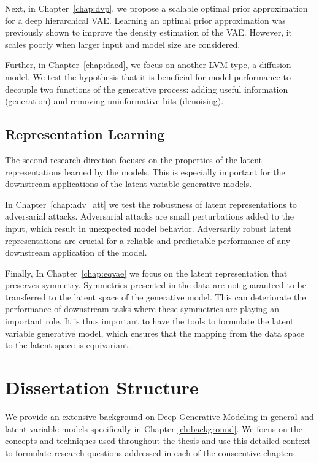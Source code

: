 Next, in Chapter~\ref{chap:dvp}, we propose a scalable optimal prior approximation for a deep hierarchical VAE. Learning an optimal prior approximation was previously shown to improve the density estimation of the VAE. However, it scales poorly when larger input and model size are considered. 

Further, in Chapter~\ref{chap:daed}, we focus on another LVM type, a diffusion model. We test the hypothesis that it is beneficial for model performance to decouple two functions of the generative process: adding useful information (generation) and removing uninformative bits (denoising). 

\subsection{Representation Learning}
The second research direction focuses on the properties of the latent representations learned by the models.
This is especially important for the downstream applications of the latent variable generative models. 

In Chapter~\ref{chap:adv_att} we test the robustness of latent representations to adversarial attacks. Adversarial attacks are small perturbations added to the input, which result in unexpected model behavior. Adversarily robust latent representations are crucial for a reliable and predictable performance of any downstream application of the model. 

Finally, In Chapter~\ref{chap:eqvae} we focus on the latent representation that preserves symmetry. Symmetries presented in the data are not guaranteed to be transferred to the latent space of the generative model. This can deteriorate the performance of downstream tasks where these symmetries are playing an important role. It is thus important to have the tools to formulate the latent variable generative model, which ensures that the mapping from the data space to the latent space is equivariant. 

\section{Dissertation Structure}
We provide an extensive background on Deep Generative Modeling in general and latent variable models specifically in Chapter \ref{ch:background}. We focus on the concepts and techniques used throughout the thesis and use this detailed context to formulate research questions addressed in each of the consecutive chapters. 

